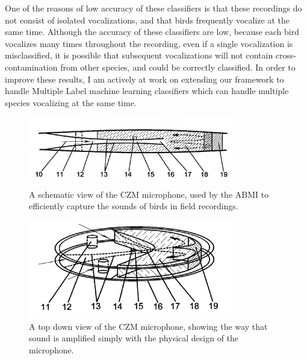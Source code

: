 \documentclass[12pt,oneside]{book}
\begin{document}
One of the reasons of low accuracy of these classifiers is that these
recordings do not consist of isolated vocalizations, and that birds
frequently vocalize at the same time.  Although the accuracy of these
classifiers are low, because each bird vocalizes many times throughout
the recording, even if a single vocalization is misclassified, it is
possible that subsequent vocalizations will not contain
cross-contamination from other species, and could be correctly
classified.  In order to improve these results, I am actively at
work on extending our framework to handle Multiple Label machine
learning classifiers which can handle multiple species vocalizing at
the same time.




\begin{figure}[h]
\centering
\includegraphics[width=90mm]{figures/czm2.png}
\caption{A schematic view of the CZM microphone, used by the ABMI to
  efficiently capture the sounds of birds in field recordings.}
\label{fig:czm2}
\end{figure}

\begin{figure}[h]
\centering
\includegraphics[width=90mm]{figures/czm3.png}
\caption{A top down view of the CZM microphone, showing the way that
  sound is amplified simply with the physical design of the microphone.}
\label{fig:czm3}
\end{figure}




	
	
\end{document}
